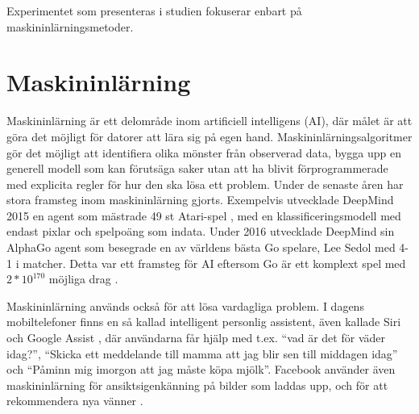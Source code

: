 \documentclass{kaumasters} %
\begin{document}
Experimentet som presenteras i studien fokuserar enbart på maskininlärningsmetoder.

\section{Maskininlärning} \label{ML}
Maskininlärning är ett delområde inom artificiell intelligens (AI), där målet är att göra det möjligt för datorer att lära sig på egen hand. Maskininlärningsalgoritmer gör det möjligt att identifiera olika mönster från observerad data, bygga upp en generell modell som kan förutsäga saker utan att ha blivit förprogrammerade med explicita regler för hur den ska lösa ett problem. Under de senaste åren har stora framsteg inom maskininlärning gjorts. Exempelvis utvecklade DeepMind \cite{DMatari00} 2015 en agent som mästrade 49 st Atari-spel \cite{wiki:004}, med en klassificeringsmodell med endast pixlar och spelpoäng som indata. Under 2016 utvecklade DeepMind sin AlphaGo \cite{DMgo} agent som besegrade en av världens bästa Go spelare, Lee Sedol \cite{wiki:005} med 4-1 i matcher. Detta var ett framsteg för AI eftersom Go är ett komplext spel med $2 * 10^{170}$ möjliga drag \cite{wiki:006}.

Maskininlärning används också för att lösa vardagliga problem. I dagens mobiltelefoner finns en så kallad intelligent personlig assistent, även kallade Siri \cite{siri} och Google Assist \cite{google},  där användarna får hjälp med t.ex. “vad är det för väder idag?”, “Skicka ett meddelande till mamma att jag blir sen till middagen idag” och “Påminn mig imorgon att jag måste köpa mjölk”. Facebook använder även maskininlärning för ansiktsigenkänning \cite{facebook:001} på bilder som laddas upp, och för att rekommendera nya vänner \cite{facebook:002}. 
\end{document}
